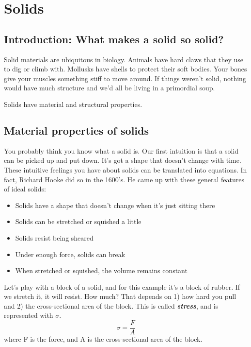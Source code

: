 

\chapter{Solids}
\label{ch:Solids}
\section{Introduction: What makes a solid so solid?}
Solid materials are ubiquitous in biology. Animals have hard claws that they use to dig or climb with. Mollusks have shells to protect their soft bodies. Your bones give your muscles something stiff to move around. If things weren't solid, nothing would have much structure and we'd all be living in a primordial soup.

Solids have material and structural properties.

\section{Material properties of solids} %

You probably think you know what a solid is. Our first intuition is that a solid can be picked up and put down. It's got a shape that doesn't change with time. These intuitive feelings you have about solids can be translated into equations. In fact, Richard Hooke did so in the 1600's. He came up with these general features of ideal solids: 

\begin{itemize}
\item Solids have a shape that doesn't change when it's just sitting there
\item Solids can be stretched or squished a little
\item Solids resist being sheared
\item Under enough force, solids can break
\item When stretched or squished, the volume remains constant
\end{itemize}

Let's play with a block of a solid, and for this example it's a block of rubber. If we stretch it, it will resist. How much? That depends on 1) how hard you pull and 2) the cross-sectional area of the block. This is called \emph{\textbf{stress}}, and is represented with $\sigma$.
\begin{equation}
\sigma = \frac{F}{A}
\end{equation}
where F is the force, and A is the cross-sectional area of the block.

